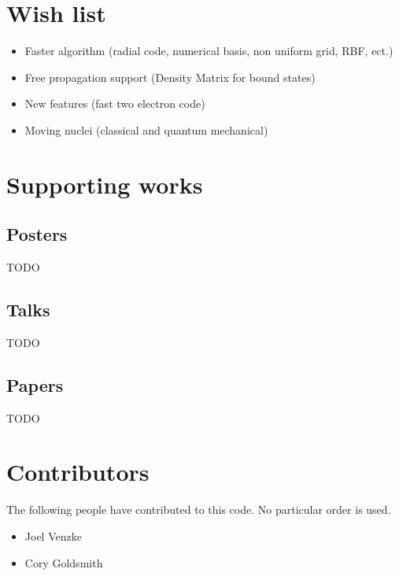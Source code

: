 \documentclass{article}
\begin{document}
\section{Wish list} %
\label{sec:wish_list}
\begin{itemize}
    \item Faster algorithm (radial code, numerical basis, non uniform grid, RBF, ect.)
    \item Free propagation support (Density Matrix for bound states)
    \item New features (fast two electron code)
    \item Moving nuclei (classical and quantum mechanical)
\end{itemize}

\section{Supporting works} %
\label{sec:supporting_works}

\subsection{Posters} %
\label{sub:posters}
TODO
\subsection{Talks} %
\label{sub:talks}
TODO
\subsection{Papers} %
\label{sub:papers}
TODO
\section{Contributors} %
\label{sec:contributors}
The following people have contributed to this code. No particular order is used.
\begin{itemize}
  \item Joel Venzke
  \item Cory Goldsmith
\end{itemize}
\end{document}
